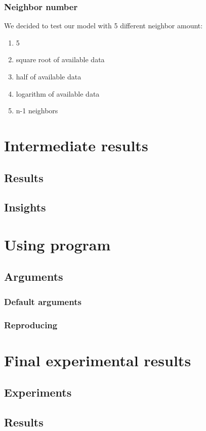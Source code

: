 \documentclass[12pt]{article}
\begin{document}
\subsubsection{Neighbor number}
We decided to test our model with 5 different neighbor amount:
\begin{enumerate}
  \item 5
  \item square root of available data
  \item half of available data
  \item logarithm of available data
  \item n-1 neighbors 
\end{enumerate}


\section{Intermediate results}
\subsection{Results}
\subsection{Insights}

\section{Using program} 
  \subsection{Arguments}
    \subsubsection{Default arguments}
    \subsubsection{Reproducing}

\section{Final experimental results}
\subsection{Experiments}
\subsection{Results}
\end{document}
